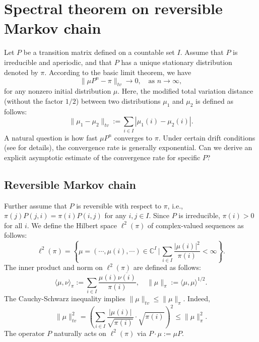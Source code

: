 \documentclass[a4]{amsart}
\newcommand{\BC}{{\mathbb {C}}}
\theoremstyle{remark} \newtheorem{remark}[theorem]{Remark}
\begin{document}
\section{Spectral theorem on reversible Markov chain}
Let $P$ be a transition matrix defined on a countable set $I$. Assume that $P$ is irreducible and aperiodic, and that $P$ has a unique stationary distribution denoted by $\pi$. According to the basic limit theorem, we have
\[
\|\mu P^n - \pi\|_{tv} \to 0, \quad \text{as } n \to \infty,
\]
for any nonzero initial distribution $\mu$. 
Here, the modified total variation distance (without the factor $1/2$) between two distributions $\mu_1$ and $\mu_2$ is defined as follows:
\[
\|\mu_1 - \mu_2\|_{tv} := \sum_{i \in I} |\mu_1(i) - \mu_2(i)|.
\]
A natural question is how fast $\mu P^n$ converges to $\pi$. Under certain drift conditions (see \cite{gallegos-herrada2024Equivalences} for details), the convergence rate is generally exponential. Can we derive an explicit asymptotic estimate of the convergence rate for specific $P$?
  
\subsection{Reversible Markov chain}
Further assume that $P$ is reversible with respect to $\pi$, i.e., $\pi(j)P(j,i) = \pi(i)P(i,j)$ for any $i, j \in I$.
Since $P$ is irreducible, $\pi(i) > 0$ for all $i$. We define the Hilbert space $\ell^2(\pi)$ of complex-valued sequences as follows:
\[
\ell^2(\pi) = \left\{\mu = (\cdots, \mu(i), \cdots) \in \BC^{I} \,\bigg|\, \sum_{i\in I}\frac{|\mu(i)|^2}{\pi(i)} < \infty\right\}.
\]
The inner product and norm on $\ell^2(\pi)$ are defined as follows:
\[
\langle \mu, \nu \rangle_\pi := \sum_{i \in I} \frac{\mu(i)\overline{\nu(i)}}{\pi(i)}, \quad \|\mu\|_{\pi} := \langle\mu,\mu\rangle^{1/2}.
\]
The Cauchy-Schwarz inequality implies $\|\mu\|_{tv} \leq \|\mu\|_\pi$. Indeed,
\[
\|\mu\|_{tv}^2 = \left(\sum_{i \in I} \frac{|\mu(i)|}{\sqrt{\pi(i)}} \cdot \sqrt{\pi(i)}\right)^2 \leq \|\mu\|_\pi^2.
\]
The operator $P$ naturally acts on $\ell^2(\pi)$ via $P \cdot \mu := \mu P$.
\end{document}
